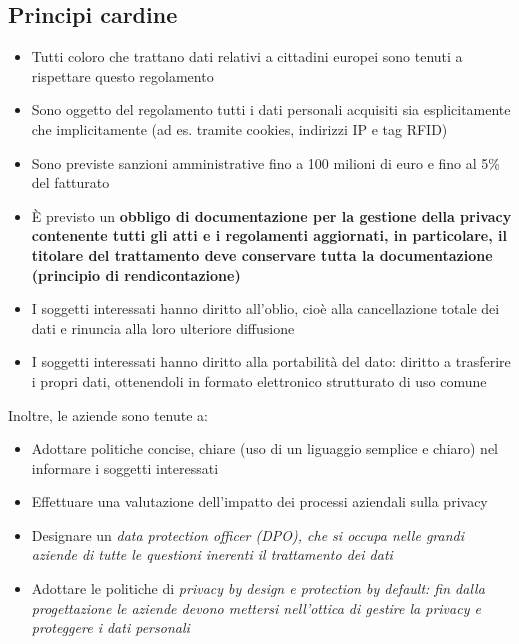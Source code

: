 \subsection{Principi cardine}
\begin{itemize}
	\item Tutti coloro che trattano dati relativi a cittadini europei sono tenuti a rispettare questo regolamento
	\item Sono oggetto del regolamento tutti i dati personali acquisiti sia esplicitamente che implicitamente (ad es. tramite cookies, indirizzi IP e tag RFID)
	\item Sono previste sanzioni amministrative fino a 100 milioni di euro e fino al 5\% del fatturato
	\item \`E previsto un \bf obbligo di documentazione \rm per la gestione della privacy contenente tutti gli atti e i regolamenti aggiornati, in particolare, il titolare del trattamento deve conservare tutta la documentazione (principio di \bf rendicontazione\rm)
	\item I soggetti interessati hanno diritto all'oblio, cio\`e alla cancellazione totale dei dati e rinuncia alla loro ulteriore diffusione
	\item I soggetti interessati hanno diritto alla portabilità del dato: diritto a trasferire i propri dati, ottenendoli in formato elettronico strutturato di uso comune
\end{itemize}
Inoltre, le aziende sono tenute a:
\begin{itemize}
	\item Adottare politiche concise, chiare (uso di un liguaggio semplice e chiaro) nel informare i soggetti interessati
	\item Effettuare una valutazione dell'impatto dei processi aziendali sulla privacy
	\item Designare un \it data protection officer \rm (DPO), che si occupa nelle grandi aziende di tutte le questioni inerenti il trattamento dei dati
	\item Adottare le politiche di \it privacy by design \rm e \it protection by default\rm: fin dalla progettazione le aziende devono mettersi nell'ottica di gestire la privacy e proteggere i dati personali 
\end{itemize}


